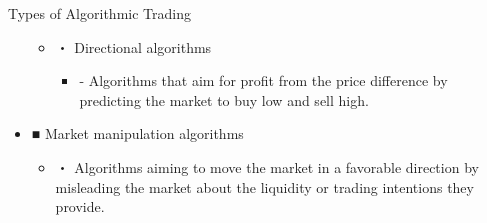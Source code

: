 \documentclass[dvipdfmx, autodetect-engine, aspectratio=169, 10.5pt]{beamer}
\begin{document}
\begin{frame}{Types of Algorithmic Trading}
\begin{itemize}
\begin{itemize}
\begin{itemize}
			            \end{itemize}
			      \item ・ Directional algorithms
			            \begin{itemize}
				            \item - Algorithms that aim for profit from the price difference by predicting the market to buy low and sell high.
			            \end{itemize}
		      \end{itemize}
		\item ■ Market manipulation algorithms
		      \begin{itemize}
			      \item ・ Algorithms aiming to move the market in a favorable direction by misleading the market about the liquidity or trading intentions they provide.
		      \end{itemize}
	\end{itemize}
\end{frame}
\end{document}
